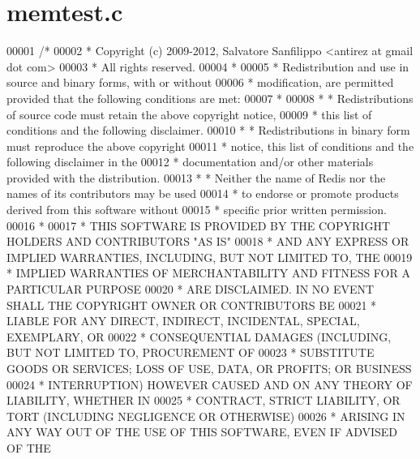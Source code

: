 \hypertarget{memtest_8c_source}{}\section{memtest.\+c}
\label{memtest_8c_source}

\begin{DoxyCode}
00001 \textcolor{comment}{/*}
00002 \textcolor{comment}{ * Copyright (c) 2009-2012, Salvatore Sanfilippo <antirez at gmail dot com>}
00003 \textcolor{comment}{ * All rights reserved.}
00004 \textcolor{comment}{ *}
00005 \textcolor{comment}{ * Redistribution and use in source and binary forms, with or without}
00006 \textcolor{comment}{ * modification, are permitted provided that the following conditions are met:}
00007 \textcolor{comment}{ *}
00008 \textcolor{comment}{ *   * Redistributions of source code must retain the above copyright notice,}
00009 \textcolor{comment}{ *     this list of conditions and the following disclaimer.}
00010 \textcolor{comment}{ *   * Redistributions in binary form must reproduce the above copyright}
00011 \textcolor{comment}{ *     notice, this list of conditions and the following disclaimer in the}
00012 \textcolor{comment}{ *     documentation and/or other materials provided with the distribution.}
00013 \textcolor{comment}{ *   * Neither the name of Redis nor the names of its contributors may be used}
00014 \textcolor{comment}{ *     to endorse or promote products derived from this software without}
00015 \textcolor{comment}{ *     specific prior written permission.}
00016 \textcolor{comment}{ *}
00017 \textcolor{comment}{ * THIS SOFTWARE IS PROVIDED BY THE COPYRIGHT HOLDERS AND CONTRIBUTORS "AS IS"}
00018 \textcolor{comment}{ * AND ANY EXPRESS OR IMPLIED WARRANTIES, INCLUDING, BUT NOT LIMITED TO, THE}
00019 \textcolor{comment}{ * IMPLIED WARRANTIES OF MERCHANTABILITY AND FITNESS FOR A PARTICULAR PURPOSE}
00020 \textcolor{comment}{ * ARE DISCLAIMED. IN NO EVENT SHALL THE COPYRIGHT OWNER OR CONTRIBUTORS BE}
00021 \textcolor{comment}{ * LIABLE FOR ANY DIRECT, INDIRECT, INCIDENTAL, SPECIAL, EXEMPLARY, OR}
00022 \textcolor{comment}{ * CONSEQUENTIAL DAMAGES (INCLUDING, BUT NOT LIMITED TO, PROCUREMENT OF}
00023 \textcolor{comment}{ * SUBSTITUTE GOODS OR SERVICES; LOSS OF USE, DATA, OR PROFITS; OR BUSINESS}
00024 \textcolor{comment}{ * INTERRUPTION) HOWEVER CAUSED AND ON ANY THEORY OF LIABILITY, WHETHER IN}
00025 \textcolor{comment}{ * CONTRACT, STRICT LIABILITY, OR TORT (INCLUDING NEGLIGENCE OR OTHERWISE)}
00026 \textcolor{comment}{ * ARISING IN ANY WAY OUT OF THE USE OF THIS SOFTWARE, EVEN IF ADVISED OF THE}

\end{DoxyCode}
